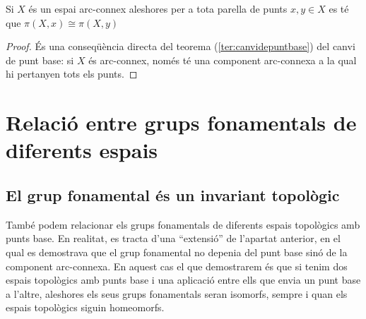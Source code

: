 \documentclass[../main.tex]{subfiles}
\begin{document}
\begin{coro}
\label{coro:canvidepuntbase} Si $X$ és un espai arc-connex aleshores per a tota parella de punts $x,y\in X$ es té que $\pi(X,x)\cong \pi(X,y)$
\end{coro}
\begin{proof}
És una conseqüència directa del teorema (\ref{ter:canvidepuntbase}) del canvi de punt base: si $X$ és arc-connex, només té una component arc-connexa a la qual hi pertanyen tots els punts.
\end{proof}

\section{Relació entre grups fonamentals de diferents espais}

\subsection{El grup fonamental és un invariant topològic}

També podem relacionar els grups fonamentals de diferents espais topològics amb punts base. En realitat, es tracta d'una ``extensió'' de l'apartat anterior, en el qual es demostrava que el grup fonamental no depenia del punt base sinó de la component arc-connexa. En aquest cas el que demostrarem és que si tenim dos espais topològics amb punts base i una aplicació entre ells que envia un punt base a l'altre, aleshores els seus grups fonamentals seran isomorfs, sempre i quan els espais topològics siguin homeomorfs.
\end{document}
